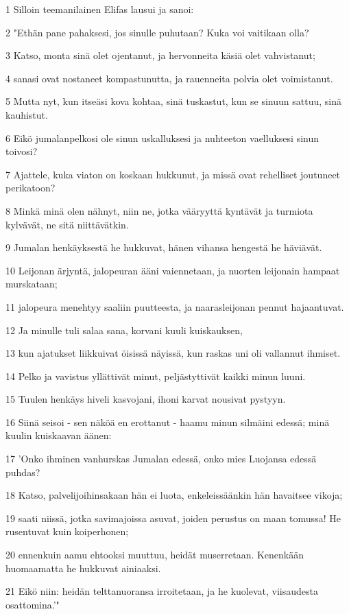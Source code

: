 \par 1 Silloin teemanilainen Elifas lausui ja sanoi:
\par 2 "Ethän pane pahaksesi, jos sinulle puhutaan? Kuka voi vaitikaan olla?
\par 3 Katso, monta sinä olet ojentanut, ja hervonneita käsiä olet vahvistanut;
\par 4 sanasi ovat nostaneet kompastunutta, ja rauenneita polvia olet voimistanut.
\par 5 Mutta nyt, kun itseäsi kova kohtaa, sinä tuskastut, kun se sinuun sattuu, sinä kauhistut.
\par 6 Eikö jumalanpelkosi ole sinun uskalluksesi ja nuhteeton vaelluksesi sinun toivosi?
\par 7 Ajattele, kuka viaton on koskaan hukkunut, ja missä ovat rehelliset joutuneet perikatoon?
\par 8 Minkä minä olen nähnyt, niin ne, jotka vääryyttä kyntävät ja turmiota kylvävät, ne sitä niittävätkin.
\par 9 Jumalan henkäyksestä he hukkuvat, hänen vihansa hengestä he häviävät.
\par 10 Leijonan ärjyntä, jalopeuran ääni vaiennetaan, ja nuorten leijonain hampaat murskataan;
\par 11 jalopeura menehtyy saaliin puutteesta, ja naarasleijonan pennut hajaantuvat.
\par 12 Ja minulle tuli salaa sana, korvani kuuli kuiskauksen,
\par 13 kun ajatukset liikkuivat öisissä näyissä, kun raskas uni oli vallannut ihmiset.
\par 14 Pelko ja vavistus yllättivät minut, peljästyttivät kaikki minun luuni.
\par 15 Tuulen henkäys hiveli kasvojani, ihoni karvat nousivat pystyyn.
\par 16 Siinä seisoi - sen näköä en erottanut - haamu minun silmäini edessä; minä kuulin kuiskaavan äänen:
\par 17 'Onko ihminen vanhurskas Jumalan edessä, onko mies Luojansa edessä puhdas?
\par 18 Katso, palvelijoihinsakaan hän ei luota, enkeleissäänkin hän havaitsee vikoja;
\par 19 saati niissä, jotka savimajoissa asuvat, joiden perustus on maan tomussa! He rusentuvat kuin koiperhonen;
\par 20 ennenkuin aamu ehtooksi muuttuu, heidät muserretaan. Kenenkään huomaamatta he hukkuvat ainiaaksi.
\par 21 Eikö niin: heidän telttanuoransa irroitetaan, ja he kuolevat, viisaudesta osattomina.'"

